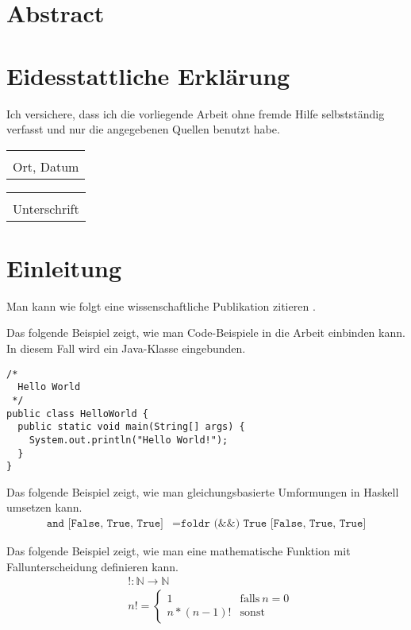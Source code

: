 \documentclass[a4paper, 10pt, DIV=13, BCOR=8mm]{scrbook}
\makeatletter
\newcommand{\hs}[1]{\texttt{#1}}
\newcommand{\signature}{%
\noindent%
\begin{tabular}{@{}p{5cm}@{}}
  \\[5\normalbaselineskip]
  \hline
  \\[-.75\normalbaselineskip]
  Ort, Datum
\end{tabular}\hspace{2ex}
\begin{tabular}{@{}p{3.1in}@{}}
  \\[5\normalbaselineskip]
  \hline
  \\[-.75\normalbaselineskip]
  Unterschrift
\end{tabular}
}
\makeatother
\begin{document}
\chapter*{Abstract}

\blindtext



\chapter*{Eidesstattliche Erklärung}

Ich versichere, dass ich die vorliegende Arbeit ohne fremde Hilfe selbstständig verfasst und nur die angegebenen Quellen benutzt habe.

\signature{}


\tableofcontents


\chapter{Einleitung}

Man kann wie folgt eine wissenschaftliche Publikation zitieren \cite{christiansen2019verifying}.

\blindtext

Das folgende Beispiel zeigt, wie man Code-Beispiele in die Arbeit einbinden kann.
In diesem Fall wird ein Java-Klasse eingebunden.
\begin{verbatim}
/*
  Hello World
 */
public class HelloWorld {
  public static void main(String[] args) {
    System.out.println("Hello World!");
  }
}
\end{verbatim}

\blindtext

Das folgende Beispiel zeigt, wie man gleichungsbasierte Umformungen in Haskell umsetzen kann.
\begin{align*}
\hs{and [False, True, True]} &= \hs{foldr (&&) True [False, True, True]}
\end{align*}

\blindtext

Das folgende Beispiel zeigt, wie man eine mathematische Funktion mit Fallunterscheidung definieren kann.
\begin{align*}
& !\colon \mathbb{N} \to \mathbb{N}\\
& n! = \begin{cases}
  1 & \mbox{falls}~n = 0\\
  n * (n-1)! & \mbox{sonst}
\end{cases}
\end{align*}

\blindtext



\end{document}
